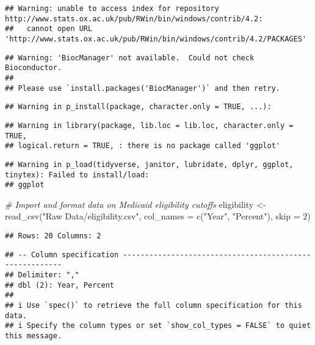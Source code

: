 \documentclass[
]{article}
\newenvironment{Shaded}{\begin{snugshade}}{\end{snugshade}}
\newcommand{\AttributeTok}[1]{\textcolor[rgb]{0.77,0.63,0.00}{#1}}
\newcommand{\CommentTok}[1]{\textcolor[rgb]{0.56,0.35,0.01}{\textit{#1}}}
\newcommand{\DecValTok}[1]{\textcolor[rgb]{0.00,0.00,0.81}{#1}}
\newcommand{\FunctionTok}[1]{\textcolor[rgb]{0.00,0.00,0.00}{#1}}
\newcommand{\NormalTok}[1]{#1}
\newcommand{\OtherTok}[1]{\textcolor[rgb]{0.56,0.35,0.01}{#1}}
\newcommand{\StringTok}[1]{\textcolor[rgb]{0.31,0.60,0.02}{#1}}
\begin{document}
\begin{verbatim}
## Warning: unable to access index for repository http://www.stats.ox.ac.uk/pub/RWin/bin/windows/contrib/4.2:
##   cannot open URL 'http://www.stats.ox.ac.uk/pub/RWin/bin/windows/contrib/4.2/PACKAGES'
\end{verbatim}

\begin{verbatim}
## Warning: 'BiocManager' not available.  Could not check Bioconductor.
## 
## Please use `install.packages('BiocManager')` and then retry.
\end{verbatim}

\begin{verbatim}
## Warning in p_install(package, character.only = TRUE, ...):
\end{verbatim}

\begin{verbatim}
## Warning in library(package, lib.loc = lib.loc, character.only = TRUE,
## logical.return = TRUE, : there is no package called 'ggplot'
\end{verbatim}

\begin{verbatim}
## Warning in p_load(tidyverse, janitor, lubridate, dplyr, ggplot, tinytex): Failed to install/load:
## ggplot
\end{verbatim}

\begin{Shaded}
\begin{Highlighting}[]
\CommentTok{\# Import and format data on Medicaid eligibility cutoffs}
\NormalTok{eligibility }\OtherTok{\textless{}{-}} \FunctionTok{read\_csv}\NormalTok{(}\StringTok{"Raw Data/eligibility.csv"}\NormalTok{, }
                        \AttributeTok{col\_names =} \FunctionTok{c}\NormalTok{(}\StringTok{"Year"}\NormalTok{, }\StringTok{"Percent"}\NormalTok{), }\AttributeTok{skip =} \DecValTok{2}\NormalTok{)}
\end{Highlighting}
\end{Shaded}

\begin{verbatim}
## Rows: 20 Columns: 2
\end{verbatim}

\begin{verbatim}
## -- Column specification --------------------------------------------------------
## Delimiter: ","
## dbl (2): Year, Percent
## 
## i Use `spec()` to retrieve the full column specification for this data.
## i Specify the column types or set `show_col_types = FALSE` to quiet this message.
\end{verbatim}
\end{document}
